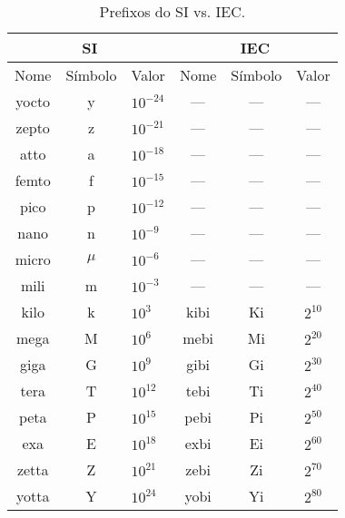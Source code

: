 \documentclass[12pt]{article}
\begin{document}
\begin{table}[h]
  \centering
  \caption{Prefixos do SI vs. IEC.}\smallskip
  \label{tab:prefixos}
  \begin{tabular}{|ccl|ccc|} \hline
    \multicolumn{3}{|c|}{SI}       & \multicolumn{3}{|c|}{IEC}   \\ \hline
    Nome  & Símbolo & Valor        & Nome & Símbolo & Valor      \\ \hline
    yocto & y       & \(10^{-24}\) & ---  & ---     & ---        \\ %
    zepto & z       & \(10^{-21}\) & ---  & ---     & ---        \\ %
    atto  & a       & \(10^{-18}\) & ---  & ---     & ---        \\ %
    femto & f       & \(10^{-15}\) & ---  & ---     & ---        \\ %
    pico  & p       & \(10^{-12}\) & ---  & ---     & ---        \\ %
    nano  & n       & \(10^{-9}\)  & ---  & ---     & ---        \\ %
    micro & \(\mu\) & \(10^{-6}\)  & ---  & ---     & ---        \\ %
    mili  & m       & \(10^{-3}\)  & ---  & ---     & ---        \\ %
    kilo  & k       & \(10^3\)     & kibi & Ki      & \(2^{10}\) \\ %
    mega  & M       & \(10^6\)     & mebi & Mi      & \(2^{20}\) \\ %
    giga  & G       & \(10^9\)     & gibi & Gi      & \(2^{30}\) \\ %
    tera  & T       & \(10^{12}\)  & tebi & Ti      & \(2^{40}\) \\ %
    peta  & P       & \(10^{15}\)  & pebi & Pi      & \(2^{50}\) \\ %
    exa   & E       & \(10^{18}\)  & exbi & Ei      & \(2^{60}\) \\ %
    zetta & Z       & \(10^{21}\)  & zebi & Zi      & \(2^{70}\) \\ %
    yotta & Y       & \(10^{24}\)  & yobi & Yi      & \(2^{80}\) \\ \hline %
  \end{tabular}
\end{table}
\end{document}
